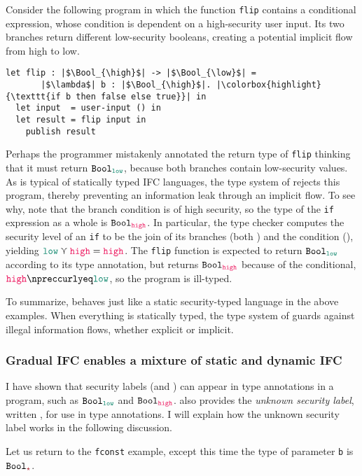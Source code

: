 Consider the following program in which the function \texttt{flip} contains a
conditional expression, whose condition is dependent on a high-security user
input. Its two branches return different low-security booleans, creating a
potential implicit flow from high to low.

\begin{lstlisting}[style=tt]
  let flip : |$\Bool_{\high}$| -> |$\Bool_{\low}$| =
       |$\lambda$| b : |$\Bool_{\high}$|. |\colorbox{highlight}{\texttt{if b then false else true}}| in
  let input  = user-input () in
  let result = flip input in
    publish result
\end{lstlisting}

\noindent Perhaps the programmer mistakenly annotated the return type of
\texttt{flip} thinking that it must return $\Bool_{\low}$, because both branches
contain low-security values. As is typical of statically typed IFC languages,
the type system of \Surface rejects this program, thereby preventing an
information leak through an implicit flow. To see why, note that the branch
condition is of high security, so the type of the \texttt{if} expression as a
whole is $\Bool_{\high}$. In particular, the type checker computes the security
level of an \texttt{if} to be the join of its branches (both \low) and the
condition (\high), yielding $\low \curlyvee \high = \high$. The \texttt{flip}
function is expected to return $\Bool_{\low}$ according to its type annotation,
but returns $\Bool_{\high}$ because of the conditional, $\high \npreccurlyeq
\low$, so the program is ill-typed.

To summarize, \Surface behaves just like a static security-typed language in the
above examples. When everything is statically typed, the type system of \Surface
guards against illegal information flows, whether explicit or implicit.

\subsubsection{Gradual IFC enables a mixture of static and dynamic IFC}

I have shown that security labels (\low and \high) can appear in type
annotations in a program, such as $\Bool_{\low}$ and $\Bool_{\high}$. \Surface
also provides the \textit{unknown security label}, written \unk, for use in type
annotations. I will explain how the unknown security label works in the
following discussion.

Let us return to the \texttt{fconst} example, except this time the type of
parameter \texttt{b} is $\Bool_{\unk}$.

